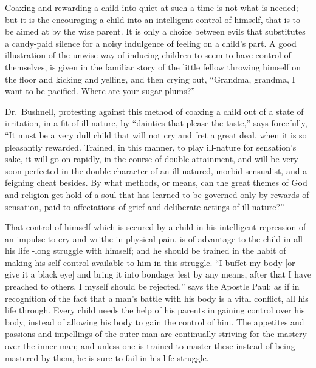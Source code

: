 \documentclass[
]{book}
\begin{document}
Coaxing and rewarding a child into quiet at such a time is not what is needed; but it is the encouraging a child into an intelligent control of himself, that is to be aimed at by the wise parent. It is only a choice between evils that substitutes a candy-paid silence for a noisy indulgence of feeling on a child's part. A good illustration of the unwise way of inducing children to seem to have control of themselves, is given in the familiar story of the little fellow throwing himself on the floor and kicking and yelling, and then crying out, ``Grandma, grandma, I want to be pacified. Where are your sugar-plums?''

Dr.~Bushnell, protesting against this method of coaxing a child out of a state of irritation, in a fit of ill-nature, by ``dainties that please the taste,'' says forcefully, ``It must be a very dull child that will not cry and fret a great deal, when it is so pleasantly rewarded. Trained, in this manner, to play ill-nature for sensation's sake, it will go on rapidly, in the course of double attainment, and will be very soon perfected in the double character of an ill-natured, morbid sensualist, and a feigning cheat besides. By what methods, or means, can the great themes of God and religion get hold of a soul that has learned to be governed only by rewards of sensation, paid to affectations of grief and deliberate actings of ill-nature?''

That control of himself which is secured by a child in his intelligent repression of an impulse to cry and writhe in physical pain, is of advantage to the child in all his life -long struggle with himself; and he should be trained in the habit of making his self-control available to him in this struggle. ``I buffet my body {[}or give it a black eye{]} and bring it into bondage; lest by any means, after that I have preached to others, I myself should be rejected,'' says the Apostle Paul; as if in recognition of the fact that a man's battle with his body is a vital conflict, all his life through. Every child needs the help of his parents in gaining control over his body, instead of allowing his body to gain the control of him. The appetites and passions and impellings of the outer man are continually striving for the mastery over the inner man; and unless one is trained to master these instead of being mastered by them, he is sure to fail in his life-struggle.
\end{document}
